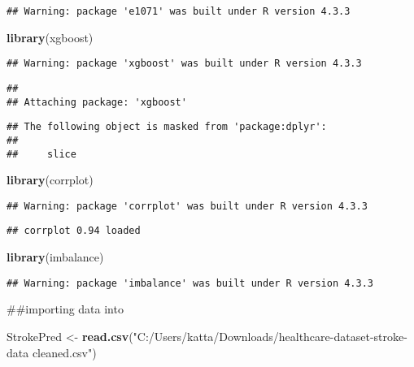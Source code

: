 \documentclass[
]{article}
\newenvironment{Shaded}{\begin{snugshade}}{\end{snugshade}}
\newcommand{\FunctionTok}[1]{\textcolor[rgb]{0.13,0.29,0.53}{\textbf{#1}}}
\newcommand{\NormalTok}[1]{#1}
\newcommand{\OtherTok}[1]{\textcolor[rgb]{0.56,0.35,0.01}{#1}}
\newcommand{\StringTok}[1]{\textcolor[rgb]{0.31,0.60,0.02}{#1}}
\begin{document}
\begin{verbatim}
## Warning: package 'e1071' was built under R version 4.3.3
\end{verbatim}

\begin{Shaded}
\begin{Highlighting}[]
\FunctionTok{library}\NormalTok{(xgboost)}
\end{Highlighting}
\end{Shaded}

\begin{verbatim}
## Warning: package 'xgboost' was built under R version 4.3.3
\end{verbatim}

\begin{verbatim}
## 
## Attaching package: 'xgboost'
\end{verbatim}

\begin{verbatim}
## The following object is masked from 'package:dplyr':
## 
##     slice
\end{verbatim}

\begin{Shaded}
\begin{Highlighting}[]
\FunctionTok{library}\NormalTok{(corrplot)}
\end{Highlighting}
\end{Shaded}

\begin{verbatim}
## Warning: package 'corrplot' was built under R version 4.3.3
\end{verbatim}

\begin{verbatim}
## corrplot 0.94 loaded
\end{verbatim}

\begin{Shaded}
\begin{Highlighting}[]
\FunctionTok{library}\NormalTok{(imbalance)}
\end{Highlighting}
\end{Shaded}

\begin{verbatim}
## Warning: package 'imbalance' was built under R version 4.3.3
\end{verbatim}

\#\#importing data into

\begin{Shaded}
\begin{Highlighting}[]
\NormalTok{StrokePred }\OtherTok{\textless{}{-}} \FunctionTok{read.csv}\NormalTok{(}\StringTok{"C:/Users/katta/Downloads/healthcare{-}dataset{-}stroke{-}data cleaned.csv"}\NormalTok{)}
\end{Highlighting}
\end{Shaded}
\end{document}
